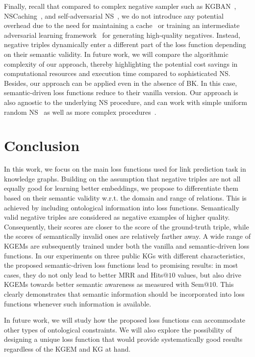 \documentclass[letterpaper]{article} %
\begin{document}
Finally, recall that compared to complex negative sampler such as KGBAN~\cite{kbgan}, NSCaching~\cite{nscaching}, and self-adversarial NS~\cite{rotate}, we do not introduce any potential overhead due to the need for maintaining a cache~\cite{nscaching} or training an intermediate adversarial learning framework~\cite{kbgan, rotate} for generating high-quality negatives. Instead, negative triples dynamically enter a different part of the loss function depending on their semantic validity. In future work, we will compare the algorithmic complexity of our approach, thereby highlighting the potential cost savings in computational resources and execution time compared to sophisticated NS. Besides, our approach can be applied even in the absence of BK. In this case, semantic-driven loss functions reduce to their vanilla version.
Our approach is also agnostic to the underlying NS procedure, and can work with simple uniform random NS~\cite{transe} as well as more complex procedures~\cite{kbgan, nscaching, rotate}.

\section{Conclusion}\label{conclusion}
In this work, we focus on the main loss functions used for link prediction task in knowledge graphs. 
Building on the assumption that negative triples are not all equally good for learning better embeddings, we propose to differentiate them based on their semantic validity w.r.t. the domain and range of relations. 
This is achieved by including ontological information into loss functions. 
Semantically valid negative triples are considered as negative examples of higher quality. Consequently, their scores are closer to the score of the ground-truth triple, while the scores of semantically invalid ones are relatively farther away. 
A wide range of KGEMs are subsequently trained under both the vanilla and semantic-driven loss functions. In our experiments on three public KGs with different characteristics, the proposed semantic-driven loss functions lead to promising results: in most cases, they do not only lead to better MRR and Hits@$10$ values, but also drive KGEMs towards better semantic awareness as measured with Sem@$10$. This clearly demonstrates that semantic information should be incorporated into loss functions whenever such information is available.

In future work, we will study how the proposed loss functions can accommodate other types of ontological constraints. We will also explore the possibility of designing a unique loss function that would provide systematically good results regardless of the KGEM and KG at hand.
\end{document}
